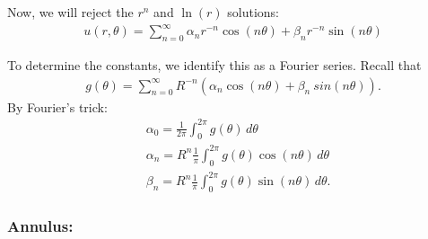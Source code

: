 \documentclass{article}
\theoremstyle{definition}
\newcommand{\f}[2]{\frac{#1}{#2}}
\begin{document}
Now, we will reject the $r^n$ and $\ln(r)$ solutions:
\begin{align*}
\boxed{u(r,\theta) = \sum^\infty_{n=0}\alpha_n r^{-n}\cos(n\theta) + \beta_n r^{-n}\sin(n\theta)} 
\end{align*} 

To determine the constants, we identify this as a Fourier series. Recall that
\begin{align*}
g(\theta) = \sum^\infty_{n=0}R^{-n}(\alpha_n \cos(n\theta) + \beta_n\ sin(n\theta)).
\end{align*}
By Fourier's trick:
\begin{align*}
&\alpha_0 = \f{1}{2\pi}\int^{2\pi}_0 g(\theta)\,d\theta\\
&\alpha_n = R^{n}\f{1}{\pi}\int^{2\pi}_0 g(\theta)\cos(n\theta)\,d\theta\\
&\beta_n = R^{n}\f{1}{\pi}\int^{2\pi}_0 g(\theta)\sin(n\theta)\,d\theta.
\end{align*}





\subsubsection{Annulus:}
\end{document}
